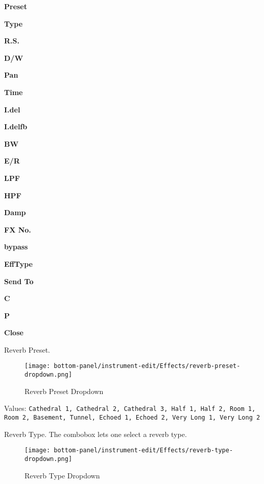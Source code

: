    \begin{enumber}
      \item \textbf{Preset}
      \item \textbf{Type}
      \item \textbf{R.S.}
      \item \textbf{D/W}
      \item \textbf{Pan}
      \item \textbf{Time}
      \item \textbf{I.del}
      \item \textbf{I.delfb}
      \item \textbf{BW}
      \item \textbf{E/R}
      \item \textbf{LPF}
      \item \textbf{HPF}
      \item \textbf{Damp}
      \item \textbf{FX No.}
      \item \textbf{bypass}
      \item \textbf{EffType}
      \item \textbf{Send To}
      \item \textbf{C}
      \item \textbf{P}
      \item \textbf{Close}
   \end{enumber}

   \setcounter{ItemCounter}{0}      %

      Reverb Preset.

\begin{figure}[H]
   \centering 
   \texttt{[image: bottom-panel/instrument-edit/Effects/reverb-preset-dropdown.png]}
   \caption{Reverb Preset Dropdown}
   \label{fig:reverb_preset_dropdown}
\end{figure}

   Values: \texttt{Cathedral 1, Cathedral 2, Cathedral 3, Half 1, Half 2,
              Room 1, Room 2, Basement, Tunnel, Echoed 1, Echoed 2, Very Long
               1, Very Long 2}

   Reverb Type.
   The combobox lets one select a reverb type.

\begin{figure}[H]
   \centering 
   \texttt{[image: bottom-panel/instrument-edit/Effects/reverb-type-dropdown.png]}
   \caption{Reverb Type Dropdown}
   \label{fig:reverb_type_dropdown}
\end{figure}

